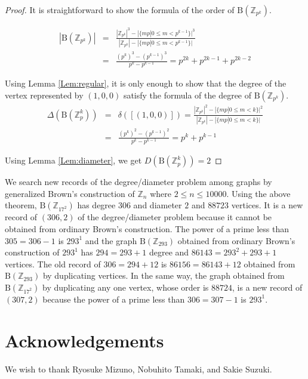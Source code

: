 \documentclass{article}
\newcommand{\Z}{\mathbb Z}
\newcommand{\B}{\mathrm{B}}
\begin{document}
\begin{proof}
It is straightforward to show the formula of the order of $\B(\Z_{p^k})$.

\begin{eqnarray*}
|\B(\Z_{p^k})| & = & \frac{|\Z_{p^k}|^3 - |\{ mp | 0 \leq m < p^{k-1} \}|^3}{|\Z_{p^k}|-|\{ mp | 0 \leq m < p^{k-1} \}|} \\ 
& = & \frac{(p^k)^3 - (p^{k-1})^3}{p^k-p^{k-1}} = p^{2k}+p^{2k-1}+p^{2k-2}
\end{eqnarray*}

Using Lemma \ref{Lem:regular}, it is only enough to show that the degree of the vertex represented by $(1,0,0)$ satisfy the formula of the degree of $\B(\Z_{p^k})$. 
\begin{eqnarray*}
\Delta(\B(\Z_p^k)) & = & \delta([(1,0,0)]) = \frac{|\Z_{p^k}|^2 - |\{ mp | 0 \leq m < k \}|^2 }{|\Z_{p^k}|-|\{ mp | 0 \leq m < k \}|} \\
& = & \frac{(p^k)^2 - (p^{k-1})^2}{p^k-p^{k-1}} = p^k + p^{k-1}
\end{eqnarray*}

Using Lemma \ref{Lem:diameter}, we get $D(\B(\Z_p^k)) = 2$

\end{proof}

We search new records of the degree/diameter problem among graphs by generalized Brown's construction of $\Z_n$ where $2 \leq n \leq 10000$.
Using the above theorem, $\B(\Z_{17^2})$ has degree $306$ and diameter $2$ and $88723$ vertices.
It is a new record of $(306,2)$ of the degree/diameter problem because it cannot be obtained from ordinary Brown's construction.
The power of a prime less than $305=306 - 1$ is $293^1$ and the graph $\B(\Z_{293})$ obtained from ordinary Brown's construction of $293^1$ has $294=293+1$ degree and $86143=293^2+293+1$ vertices.
The old record of $306=294+12$ is $86156=86143+12$ obtained from $\B(\Z_{293})$ by duplicating vertices.
In the same way, the graph obtained from $\B(\Z_{17^2})$ by duplicating any one vertex, whose order is $88724$, is a new record of $(307,2)$ because the power of a prime less than $306=307-1$ is $293^1$.

\section*{Acknowledgements}
We wish to thank Ryosuke Mizuno, Nobuhito Tamaki, and Sakie Suzuki.



\end{document}
